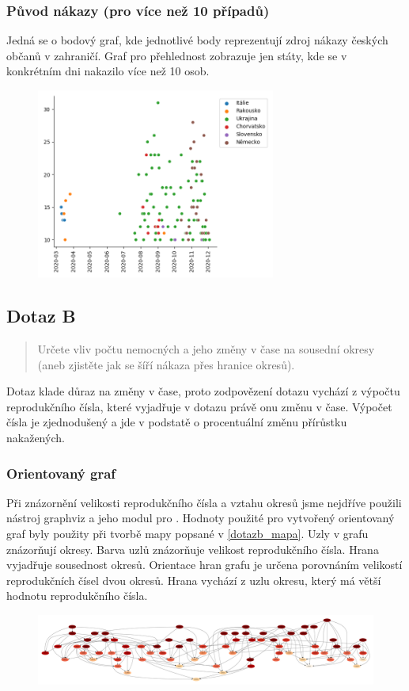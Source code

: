 \documentclass[11pt,a4paper,titlepage]{article}
\begin{document}
\subsubsection{Původ nákazy (pro více než 10 případů)}
Jedná se o bodový graf, kde jednotlivé body reprezentují zdroj nákazy českých občanů v zahraničí. Graf pro přehlednost zobrazuje jen státy, kde se v konkrétním dni nakazilo více než 10 osob.
\begin{figure}[h]
    \centering
    \includegraphics[width=0.70\textwidth]{img/external_country.png}
    \label{fig:external_country}
\end{figure}

\newpage
\subsection{Dotaz B}
\begin{quote}
Určete vliv počtu nemocných a jeho změny v čase na sousední okresy (aneb zjistěte jak se šíří nákaza přes hranice okresů).
\end{quote}
Dotaz klade důraz na změny v čase, proto zodpovězení dotazu vychází z výpočtu reprodukčního čísla, které vyjadřuje v dotazu právě onu změnu v čase. Výpočet čísla je zjednodušený a jde v podstatě o procentuální změnu přírůstku nakažených.

\subsubsection{Orientovaný graf}\label{dotazb_ograf}
Při znázornění velikosti reprodukčního čísla a vztahu okresů jsme nejdříve použili nástroj graphviz a jeho modul pro \cite{python}. Hodnoty použité pro vytvořený orientovaný graf byly použity při tvorbě mapy popsané v \ref{dotazb_mapa}. Uzly v grafu znázorňují okresy. Barva uzlů znázorňuje velikost reprodukčního čísla. Hrana vyjadřuje sousednost okresů. Orientace hran grafu je určena porovnáním velikostí reprodukčních čísel dvou okresů. Hrana vychází z uzlu okresu, který má větší hodnotu reprodukčního čísla.
\begin{figure}[h]
    \centering
    \includegraphics[width=\textwidth]{img/fsm.gv.pdf}
    \label{fig:external_country}
\end{figure}
\end{document}
